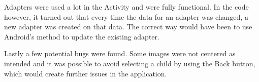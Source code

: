 Adapters were used a lot in the Activity and were fully functional. In the code however, it turned out that every time the data for an adapter was changed, a new adapter was created on that data. The correct way would have been to use Android's  method to update the existing adapter.

Lastly a few potential bugs were found. Some images were not centered as intended and it was possible to avoid selecting a child by using the Back button, which would create further issues in the application.